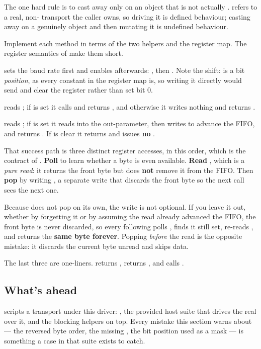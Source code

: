 The one hard rule is to cast away  only on an object that is not actually .
 refers to a real, non- transport the caller owns, so driving it is
defined behaviour; casting away  on a genuinely  object and then mutating it
is undefined behaviour.

\label{c7:ex:1.3}
Implement each  method in terms of the two helpers and the register map. The
register semantics of  make them short.

 sets the baud rate first and enables afterwards:
, then . Note the shift:
 is a bit \emph{position}, as every constant in the register map is, so writing it
directly would send  and clear the register rather than set bit 0.

 reads ; if  is set it calls
 and returns , and otherwise it writes nothing and returns
.

 reads ; if  is set it reads  into the
out-parameter, then writes  to advance the FIFO, and returns .
If  is clear it returns  and issues \textbf{no} .

That success path is three distinct register accesses, in this order, which is the contract of
. \textbf{Poll}  to learn whether a byte is even available.
\textbf{Read} , which is a \emph{pure read}: it returns the front byte but does
\textbf{not} remove it from the FIFO. Then \textbf{pop} by writing , a separate write
that discards the front byte so the next call sees the next one.

Because  does not pop on its own, the  write is not optional. If you leave
it out, whether by forgetting it or by assuming the read already advanced the FIFO, the front byte is
never discarded, so every following  polls , finds it still set, re-reads
, and returns the \textbf{same byte forever}. Popping \emph{before} the read is the
opposite mistake: it discards the current byte unread and skips data.

The last three are one-liners.  returns , 
returns , and  calls .

\subsection*{What's ahead}
 scripts a transport under this driver: , the provided host
suite that drives the real  over it, and the blocking helpers on top. Every mistake this
section warns about --- the reversed byte order, the missing , the bit position used as
a mask --- is something a case in that suite exists to catch.
